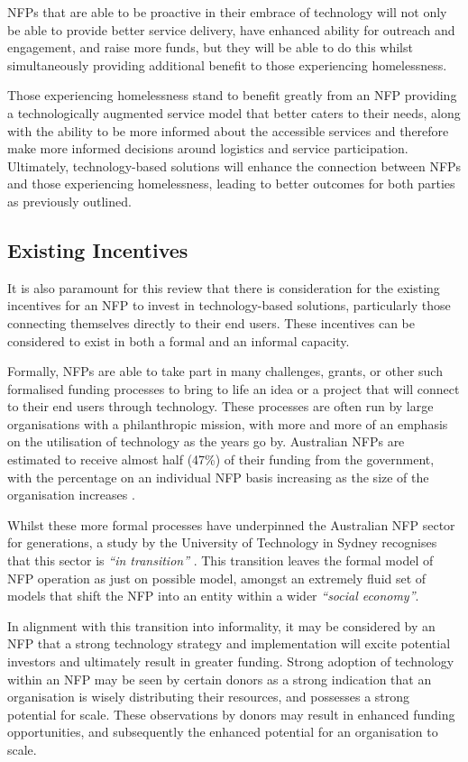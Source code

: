 NFPs that are able to be proactive in their embrace of technology will not only be able to provide better service delivery, have enhanced ability for outreach and engagement, and raise more funds, but they will be able to do this whilst simultaneously providing additional benefit to those experiencing homelessness. 

Those experiencing homelessness stand to benefit greatly from an NFP providing a technologically augmented service model that better caters to their needs, along with the ability to be more informed about the accessible services and therefore make more informed decisions around logistics and service participation. Ultimately, technology-based solutions will enhance the connection between NFPs and those experiencing homelessness, leading to better outcomes for both parties as previously outlined.

\subsection{Existing Incentives}

It is also paramount for this review that there is consideration for the existing incentives for an NFP to invest in technology-based solutions, particularly those connecting themselves directly to their end users. These incentives can be considered to exist in both a formal and an informal capacity.

Formally, NFPs are able to take part in many challenges, grants, or other such formalised funding processes to bring to life an idea or a project that will connect to their end users through technology. These processes are often run by large organisations with a philanthropic mission, with more and more of an emphasis on the utilisation of technology as the years go by. Australian NFPs are estimated to receive almost half (47\%) of their funding from the government, with the percentage on an individual NFP basis increasing as the size of the organisation increases \cite{acnc2020}.

Whilst these more formal processes have underpinned the Australian NFP sector for generations, a study by the University of Technology in Sydney recognises that this sector is \emph{“in transition”} \cite{logue2014emergence}. This transition leaves the formal model of NFP operation as just on possible model, amongst an extremely fluid set of models that shift the NFP into an entity within a wider \emph{“social economy”}. 

In alignment with this transition into informality, it may be considered by an NFP that a strong technology strategy and implementation will excite potential investors and ultimately result in greater funding. Strong adoption of technology within an NFP may be seen by certain donors as a strong indication that an organisation is wisely distributing their resources, and possesses a strong potential for scale. These observations by donors may result in enhanced funding opportunities, and subsequently the enhanced potential for an organisation to scale.

